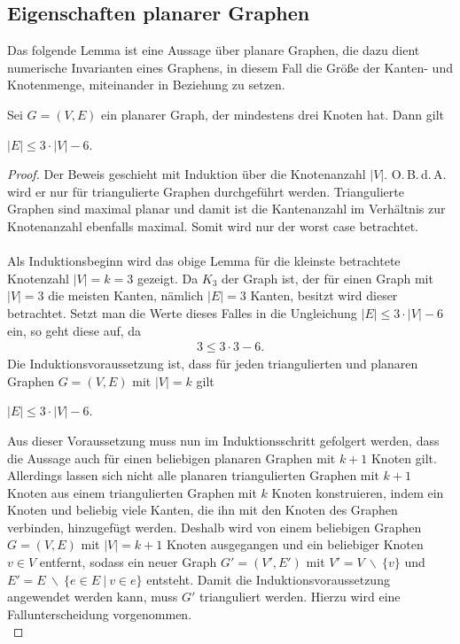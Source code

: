 \subsection{Eigenschaften planarer Graphen}
Das folgende Lemma ist eine Aussage über planare Graphen, die dazu dient numerische Invarianten eines Graphens, in diesem Fall die Größe der Kanten- und Knotenmenge, miteinander in Beziehung zu setzen.
\begin{lemma}\label{lemma1}
Sei $G=(V,E)$ ein planarer Graph, der mindestens drei Knoten hat. Dann gilt
\begin{center}
$|E|\leq 3 \cdot |V| -6$.
\end{center}
\end{lemma}
\begin{proof}
Der Beweis geschieht mit Induktion über die Knotenanzahl $|V|$.  O.\,B.\,d.\,A. wird er nur für triangulierte Graphen durchgeführt werden. Triangulierte Graphen sind maximal planar und damit ist die Kantenanzahl im Verhältnis zur Knotenanzahl ebenfalls maximal. Somit wird nur der worst case betrachtet.\\ \\
Als Induktionsbeginn wird das obige Lemma für die kleinste betrachtete Knotenzahl $|V|=k=3$ gezeigt. Da $K_3$ der Graph ist, der für einen Graph mit $|V|=3$ die meisten Kanten, nämlich $|E|=3$ Kanten, besitzt wird dieser betrachtet. Setzt man die Werte dieses Falles in die Ungleichung $|E| \leq 3 \cdot |V| -6$ ein, so geht diese auf, da
\begin{align*}
3 \leq 3\cdot 3 -6.
\end{align*}
Die Induktionsvoraussetzung ist, dass für jeden triangulierten und planaren Graphen $G=(V,E)$ mit $|V|=k$ gilt
\begin{center}
$|E| \leq 3 \cdot |V| -6$.
\end{center}
Aus dieser Voraussetzung muss nun im Induktionsschritt gefolgert werden, dass die Aussage auch für einen beliebigen planaren Graphen mit $k+1$ Knoten gilt. Allerdings lassen sich nicht alle planaren triangulierten Graphen mit $k+1$ Knoten aus einem triangulierten Graphen mit $k$ Knoten konstruieren, indem ein Knoten und beliebig viele Kanten, die ihn mit den Knoten des Graphen verbinden, hinzugefügt werden. Deshalb wird von einem beliebigen Graphen $G=(V,E)$ mit $|V|=k+1$ Knoten ausgegangen und ein beliebiger Knoten $v\in V$ entfernt, sodass ein neuer Graph $G'=(V',E')$ mit $V'=V \: \backslash \:  \{v\}$ und $E'=E \: \backslash \: \{e\in E\: |\: v\in e\}$ entsteht. Damit die Induktionsvoraussetzung angewendet werden kann, muss $G'$ trianguliert werden. Hierzu wird eine Fallunterscheidung vorgenommen. \\

\end{proof}

